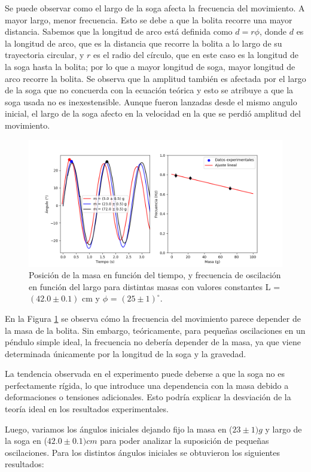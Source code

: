 \documentclass[12pt,a4]{article}
\begin{document}
Se puede observar como el largo de la soga afecta la frecuencia del movimiento. A mayor largo, menor frecuencia. Esto se debe a que la bolita recorre una mayor distancia. Sabemos que la longitud de arco está definida como $d = r \phi$, donde $d$ es la longitud de arco, que es la distancia que recorre la bolita a lo largo de su trayectoria circular, y $r$ es el radio del círculo, que en este caso es la longitud de la soga hasta la bolita; por lo que a mayor longitud de soga, mayor longitud de arco recorre la bolita. 
Se observa que la amplitud también es afectada por el largo de la soga que no concuerda con la ecuación teórica y esto se atribuye a que la soga usada no es inexestensible. Aunque fueron lanzadas desde el mismo angulo inicial, el largo de la soga afecto en la velocidad en la que se perdió amplitud del movimiento.
\begin{figure}[H]
    \centering
    \includegraphics[width=0.6\linewidth]{peso.png}
    \caption{Posición de la masa en función del tiempo, y frecuencia de oscilación en función del largo para distintas masas con valores constantes L = $(42.0 \pm 0.1)$ cm y $\phi$ = $(25 \pm 1) ^\circ$.}
    \label{fig:masa}
\end{figure}

En la Figura \ref{fig:masa} se observa cómo la frecuencia del movimiento parece depender de la masa de la bolita. Sin embargo, teóricamente, para pequeñas oscilaciones en un péndulo simple ideal, la frecuencia no debería depender de la masa, ya que viene determinada únicamente por la longitud de la soga y la gravedad.

La tendencia observada en el experimento puede deberse a que la soga no es perfectamente rígida, lo que introduce una dependencia con la masa debido a deformaciones o tensiones adicionales. Esto podría explicar la desviación de la teoría ideal en los resultados experimentales.

Luego, variamos los ángulos iniciales dejando fijo la masa en ($23 \pm 1) g$ y largo de la soga en ($42.0 \pm 0.1) cm$ para poder analizar la suposición de pequeñas oscilaciones. Para los distintos ángulos iniciales se obtuvieron los siguientes resultados:
\end{document}
